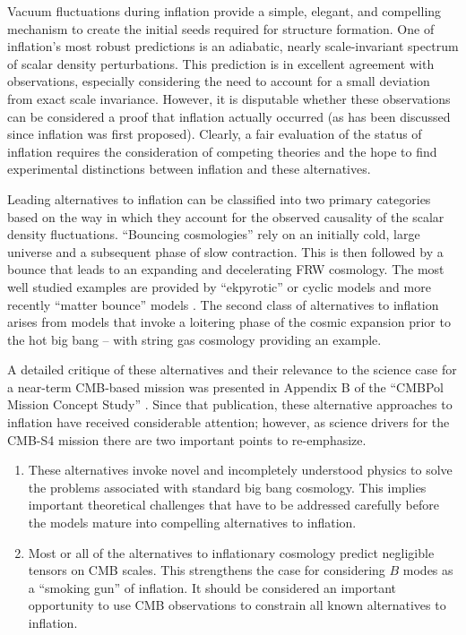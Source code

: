 Vacuum fluctuations during inflation provide a simple, elegant, and compelling mechanism to create the initial seeds required for structure formation. 
One of inflation's most robust predictions is an adiabatic, nearly
scale-invariant spectrum of scalar density perturbations.
This prediction is in excellent agreement with observations, especially
considering the need to account for a small deviation from exact scale
invariance.  However, it is disputable whether these observations can be
considered a proof that inflation actually occurred (as has been discussed
since inflation was first proposed).
Clearly, a fair evaluation of the status of inflation requires the
consideration of competing theories and the hope to find experimental distinctions between inflation and these alternatives.

Leading alternatives to inflation can be classified into two primary categories based on the 
way in which they account for the observed causality of the scalar density fluctuations.
``Bouncing cosmologies'' rely on an initially cold, large universe and a subsequent phase of
slow contraction. This is then followed by a bounce that leads
to an expanding and decelerating FRW cosmology.  The most well studied examples are provided by 
``ekpyrotic'' or cyclic models \cite{Khoury:2001bz,Khoury:2001wf}
and more recently ``matter bounce'' models \cite{Brandenberger:2012zb,Cai:2014jla,deHaro:2015wda}.
The second class of alternatives to inflation arises from models that invoke a loitering phase of the cosmic expansion prior to the hot big bang -- with 
string gas cosmology \cite{Brandenberger:1988aj,Tseytlin:1991xk,Battefeld:2005av} providing an example. 

A detailed critique of these alternatives and their relevance to the science case for a
near-term CMB-based mission was presented in Appendix B of the ``CMBPol
Mission Concept Study'' \cite{Baumann:2008aq}.  
Since that publication, these alternative approaches to inflation have received considerable attention;
however, as science drivers for the CMB-S4 mission there are two important points to re-emphasize.
\begin{enumerate}
\item These alternatives invoke novel and incompletely understood physics to solve the problems associated with standard big bang cosmology.  This implies important theoretical challenges that have to be addressed carefully before the models mature into compelling alternatives to inflation.

\item Most or all of the alternatives to inflationary cosmology predict negligible tensors on CMB scales.
This strengthens the case for considering $B$ modes as a ``smoking gun'' of inflation.  It should be considered an important
opportunity to use CMB observations to constrain all known alternatives to inflation.
\end{enumerate}

